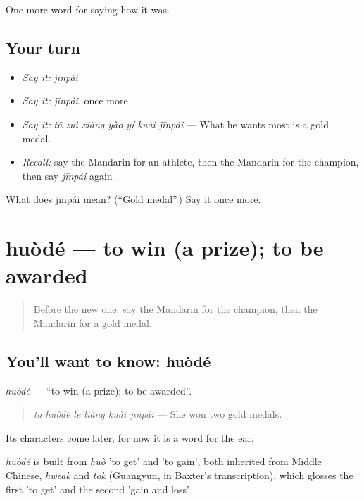 \begin{grammarlens}[title={What you've built}]
One more word for saying how it was.
\end{grammarlens}

\subsection*{Your turn}
\begin{itemize}
\raggedright
  \item \emph{Say it:} \emph{jīnpái}
  \item \emph{Say it:} \emph{jīnpái}, once more
  \item \emph{Say it:} \emph{tā zuì xiǎng yào yí kuài jīnpái} — What he wants most is a gold medal.
  \item \emph{Recall:} say the Mandarin for an athlete, then the Mandarin for the champion, then say \emph{jīnpái} again
\end{itemize}

\begin{tcolorbox}[breakable,colback=teal!4,colframe=teal!35!black,title={Before you move on}]
What does jīnpái mean? (\textquotedblleft{}Gold medal\textquotedblright{}.) Say it once more.
\end{tcolorbox}
\section[huòdé]{huòdé — to win (a prize); to be awarded}

\label{lesson:ZH-C501-huode}



\begin{quote}
Before the new one: say the Mandarin for the champion, then the Mandarin for a gold medal.
\end{quote}

\subsection*{You'll want to know: huòdé}
\emph{huòdé} — \textquotedblleft{}to win (a prize); to be awarded\textquotedblright{}.

\begin{quote}
\emph{tā huòdé le liǎng kuài jīnpái} — She won two gold medals.
\end{quote}

Its characters come later; for now it is a word for the ear.

\begin{cousinweb}
\emph{huòdé} is built from \emph{huò} 'to get' and  'to gain', both inherited from Middle Chinese, \emph{hweak} and \emph{tok} (Guangyun, in Baxter's transcription), which glosses the first 'to get' and the second 'gain and loss'.
\end{cousinweb}

